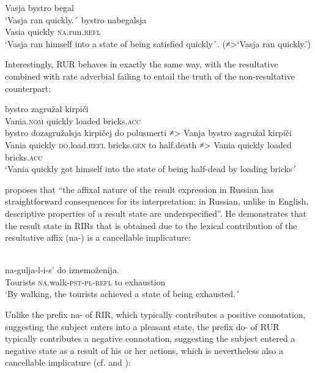 \documentclass[output=paper,colorlinks,citecolor=brown]{./langscibook}
\begin{document}
\ea%
    \label{ex:antonyuk:40}
    \ea \label{ex:antonyuk:40a}
    {Vasja} {bystro} {begal}\\
    `Vasja ran quickly.´
    \ex \label{ex:antonyuk:40b}
     {bystro} {nabegalsja}\\
    Vasia quickly \textsc{na}.run.\textsc{refl}\\
    \glt `Vasja ran himself into a state of being satisfied quickly´. (≠>‘Vasja ran quickly.’)
    \z
\z

Interestingly, RUR behaves in exactly the same way, with the resultative combined with rate adverbial failing to entail the truth of the non-resultative counterpart:

\ea%
    \label{ex:antonyuk:41}
    \ea \label{ex:antonyuk:41a}
             {bystro}   {zagružal} {kirpiči}\\
    Vania.\textsc{nom} quickly loaded     bricks.\textsc{acc}\\
    \ex \label{ex:antonyuk:41b}
     {bystro}     {dozagružalsja}   {kirpičej}       {do}  {polusmerti} {≠>} {Vanja}  {bystro}   {zagružal}   {kirpiči} \\
    Vania quickly \textsc{do}.load.\textsc{refl}   bricks.\textsc{gen}  to  half.death  ≠> Vania quickly loaded   bricks.\textsc{acc}\\
    \glt `Vania quickly got himself into the state of being half-dead by loading bricks´
    \z
\z

\citeauthor{Tatevosov2010} proposes that “the affixal nature of the result expression in Russian has straightforward consequences for its interpretation: in Russian, unlike in English, descriptive properties of a result state are underspecified”. He demonstrates that the result state in RIRs that is obtained due to the lexical contribution of the resultative affix ({na}{}-) is a cancellable implicature:

\ea%
    \label{ex:antonyuk:42}
    \citep{Tatevosov2010}\\
     {na-gulja-l-i-s’} {do} {iznemoženija.}\\
    Tourists   \textsc{na}.walk\textsc{-pst-pl-refl} to exhaustion\\
    \glt `By walking, the tourists achieved a state of being exhausted.´ 
    \z

Unlike the prefix {na}{}- of RIR, which typically contributes a positive connotation, suggesting the subject enters into a pleasant state, the prefix {do{}-} of RUR typically contributes a negative connotation, suggesting the subject entered a negative state as a result of his or her actions, which is nevertheless also a cancellable implicature (cf.  and ):
\end{document}
